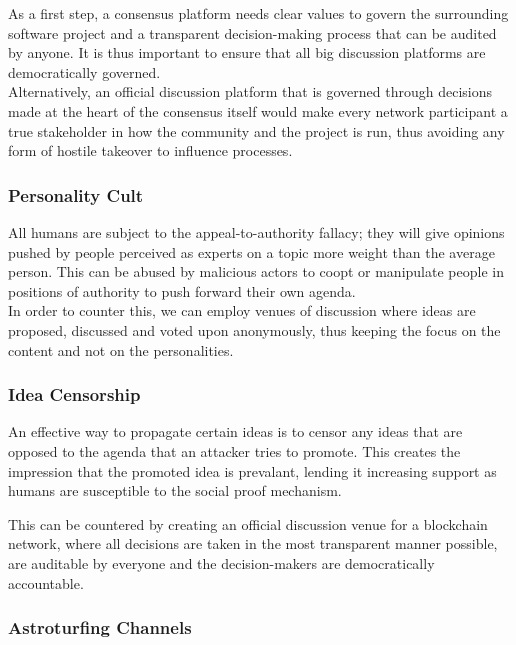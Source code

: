 \documentclass[11pt,a4paper]{article}
\begin{document}
As a first step, a consensus platform needs clear values to govern the surrounding software project and a transparent decision-making process that can be audited by anyone. It is thus important to ensure that all big discussion platforms are democratically governed.\\

Alternatively, an official discussion platform that is governed through decisions made at the heart of the consensus itself would make every network participant a true stakeholder in how the community and the project is run, thus avoiding any form of hostile takeover to influence processes.\\

\subsubsection{Personality Cult}

All humans are subject to the appeal-to-authority fallacy; they will give opinions pushed by people perceived as experts on a topic more weight than the average person. This can be abused by malicious actors to coopt or manipulate people in positions of authority to push forward their own agenda.\\

In order to counter this, we can employ venues of discussion where ideas are proposed, discussed and voted upon anonymously, thus keeping the focus on the content and not on the personalities.\\

\subsubsection{Idea Censorship}

An effective way to propagate certain ideas is to censor any ideas that are opposed to the agenda that an attacker tries to promote. This creates the impression that the promoted idea is prevalant, lending it increasing support as humans are susceptible to the social proof mechanism.

This can be countered by creating an official discussion venue for a blockchain network, where all decisions are taken in the most transparent manner possible, are auditable by everyone and the decision-makers are democratically accountable.\\

\subsubsection{Astroturfing Channels}
\end{document}
